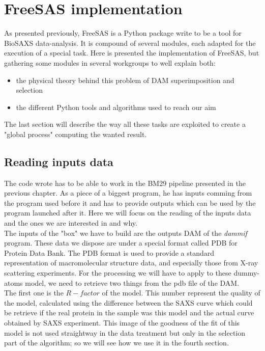 \documentclass[a4paper, 11pt]{report}
\begin{document}
\chapter{FreeSAS implementation}

As presented previously, FreeSAS is a Python package write to be a 
tool for BioSAXS data-analysis. 
It is compound of several modules, each adapted for the execution of a 
special task. 
Here is presented the implementation of FreeSAS, but gathering some 
modules in several workgroups to well explain both:
\begin{itemize}
 \item the physical theory behind this problem of DAM superimposition 
and selection
 \item the different Python tools and algorithms used to reach our aim
\end{itemize}

The last section will describe the way all these tasks are exploited 
to create a "global process" computing the wanted result. 

\section{Reading inputs data}

The code wrote has to be able to work in the BM29 pipeline presented 
in the previous chapter. 
As a piece of a biggest program, he has inputs comming from the 
program used before it and has to provide outputs which can be used by 
the program launched after it. 
Here we will focus on the reading of the inputs data and the ones we  
are interested in and why.\\

The inputs of the "box" we have to build are the outputs DAM of the 
\textit{dammif} program. 
These data we dispose are under a special format called PDB for 
Protein Data Bank. %
The PDB format is used to provide a standard representation of 
macromolecular structure data, and especially those from X-ray 
scattering experiments. 
For the processing we will have to apply to these dummy-atoms model, 
we need to retrieve two things from the pdb file of the DAM.\\

The first one is the $R-factor$ of the model. 
This number represent the quality of the model, calculated using the 
difference between the SAXS curve which could be retrieve if the real 
protein in the sample was this model and the actual curve obtained by 
SAXS experiment. 
This image of the goodness of the fit of this model is not used 
straightway in the data treatment but only in the selection part of 
the algorithm; so we will see how we use it in the fourth section.\\
\end{document}
